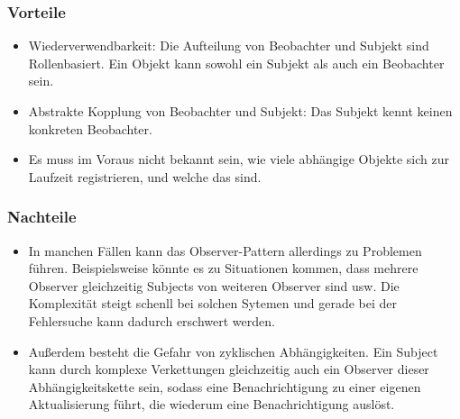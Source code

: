 \subsubsection{Vorteile}
\begin{itemize}
\item Wiederverwendbarkeit: Die Aufteilung von Beobachter und Subjekt sind Rollenbasiert. Ein Objekt kann sowohl ein Subjekt als auch ein Beobachter sein.
\item Abstrakte Kopplung von Beobachter und Subjekt: Das Subjekt kennt keinen konkreten Beobachter.  
\item Es muss im Voraus nicht bekannt sein, wie viele abhängige Objekte sich zur Laufzeit registrieren, und welche das sind.
\end{itemize}
\subsubsection{Nachteile}
\begin{itemize}
\item In manchen Fällen kann das Observer-Pattern allerdings zu Problemen führen. Beispielsweise könnte es zu Situationen kommen, dass mehrere Observer gleichzeitig Subjects von weiteren Observer sind usw. Die Komplexität steigt schenll bei solchen Sytemen und gerade bei der Fehlersuche kann dadurch erschwert werden.
\item Außerdem besteht die Gefahr von zyklischen Abhängigkeiten. Ein Subject kann durch komplexe Verkettungen gleichzeitig auch ein Observer dieser Abhängigkeitskette sein, sodass eine Benachrichtigung zu einer eigenen Aktualisierung führt, die wiederum  eine Benachrichtigung auslöst.
\end{itemize}
